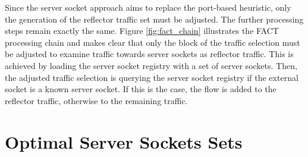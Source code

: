 Since the server socket approach aims to replace the port-based heuristic, only the generation of the reflector traffic set must be adjusted. The further processing steps remain exactly the same. Figure \ref{fig:fact_chain} illustrates the FACT processing chain and makes clear that only the block of the traffic selection must be adjusted to examine traffic towards server sockets as reflector traffic. This is achieved by loading the server socket registry with a set of server sockets. Then, the adjusted traffic selection is querying the server socket registry if the external socket is a known server socket. If this is the case, the flow is added to the reflector traffic, otherwise to the remaining traffic. 

\section{Optimal Server Sockets Sets\label{section:ses_selection}}
